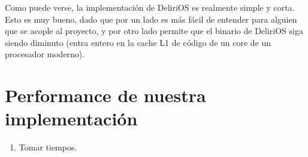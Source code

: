 Como puede verse, la implementación de DeliriOS es realmente simple y corta. Esto es muy bueno, dado que por un lado es más fácil de entender para alguien que se acople al proyecto, y por otro lado permite que el binario de DeliriOS siga siendo diminuto (entra entero en la cache L1 de código de un core de un procesador moderno).



\section{Performance de nuestra implementación}

\begin{enumerate}
  \item Tomar tiempos.
\end{enumerate}

